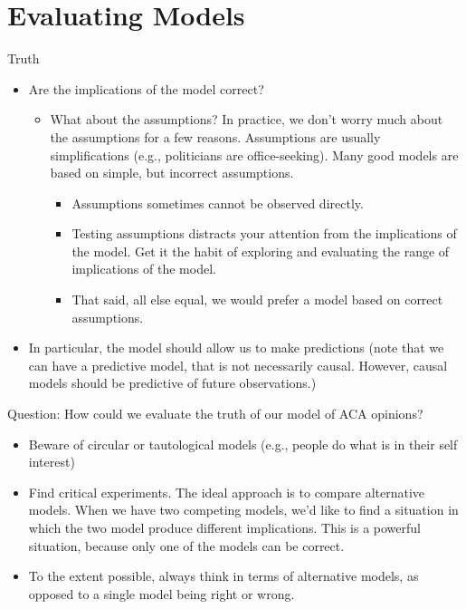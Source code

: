 \documentclass[]{book}
\providecommand{\tightlist}{%
  \setlength{\itemsep}{0pt}\setlength{\parskip}{0pt}}
\theoremstyle{definition}
\theoremstyle{definition}
\theoremstyle{definition}
\theoremstyle{remark}
\begin{document}
\section{Evaluating Models}\label{evaluating-models}

Truth

\begin{itemize}
\tightlist
\item
  Are the implications of the model correct?

  \begin{itemize}
  \tightlist
  \item
    What about the assumptions? In practice, we don't worry much about
    the assumptions for a few reasons. Assumptions are usually
    simplifications (e.g., politicians are office-seeking). Many good
    models are based on simple, but incorrect assumptions.

    \begin{itemize}
    \tightlist
    \item
      Assumptions sometimes cannot be observed directly.
    \item
      Testing assumptions distracts your attention from the implications
      of the model. Get it the habit of exploring and evaluating the
      range of implications of the model.
    \item
      That said, all else equal, we would prefer a model based on
      correct assumptions.
    \end{itemize}
  \end{itemize}
\item
  In particular, the model should allow us to make predictions (note
  that we can have a predictive model, that is not necessarily causal.
  However, causal models should be predictive of future observations.)
\end{itemize}

Question: How could we evaluate the truth of our model of ACA opinions?

\begin{itemize}
\tightlist
\item
  Beware of circular or tautological models (e.g., people do what is in
  their self interest)
\item
  Find critical experiments. The ideal approach is to compare
  alternative models. When we have two competing models, we'd like to
  find a situation in which the two model produce different
  implications. This is a powerful situation, because only one of the
  models can be correct.
\item
  To the extent possible, always think in terms of alternative models,
  as opposed to a single model being right or wrong.
\end{itemize}
\end{document}
